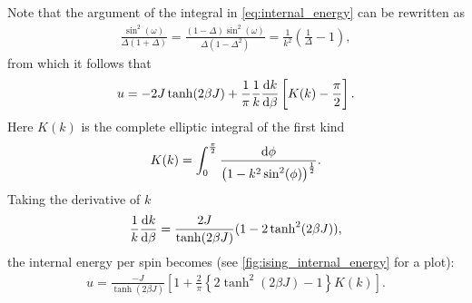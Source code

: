 \documentclass[11pt, a4paper]{report} %
\begin{document}
Note that the argument of the integral in \cref{eq:internal_energy} can be rewritten as
\begin{align}
	\frac{\sin^2(\omega)}{\Delta (1+\Delta)} = \frac{(1 - \Delta) \sin^2(\omega)}{\Delta(1-\Delta^2)} = \frac{1}{k^2}\left(\frac{1}{\Delta} - 1\right),
\end{align}
from which it follows that
\begin{align}
	u = - 2 J \tanh(2\beta J) + \frac{1}{\pi} \frac{1}{k} \frac{\dif k}{\dif \beta} \left[ K(k) - \frac{\pi}{2}\right].
\end{align}
Here \(K(k)\) is the complete elliptic integral of the first kind
\begin{align}
	K(k) = \int_0^{\frac{\pi}{2}} \frac{\dif \phi}{\left(1-k^2 \sin^2(\phi)\right)^{\frac{1}{2}}}.
\end{align}
Taking the derivative of \(k\)
\begin{align}
	\label{eq:k_derivative}
	\frac{1}{k}\frac{\dif k}{\dif \beta} = \frac{2 J}{\tanh(2\beta J)} (1 - 2\tanh^2(2 \beta J)),
\end{align}
the internal energy per spin becomes (see \cref{fig:ising_internal_energy} for a plot):
\begin{align}
	\label{eq:ising_internal_energy}
	u = \frac{-J}{\tanh(2\beta J)} \left[1 + \frac{2}{\pi} \left\{2 \tanh^2(2\beta J) -1 \right\} K(k) \right].
\end{align}
\end{document}
